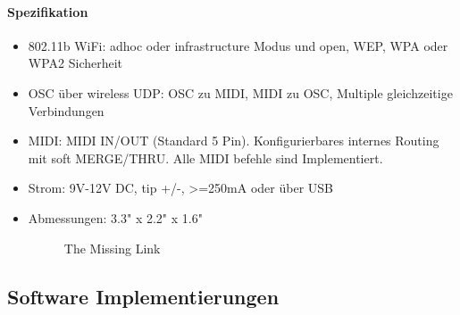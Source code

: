 \documentclass[a4paper, 12pt]{article}
\begin{document}
\paragraph{Spezifikation}
\begin{itemize}
  \item 802.11b WiFi: adhoc oder infrastructure Modus und open, WEP, WPA oder WPA2 Sicherheit
  \item OSC über wireless UDP: OSC zu MIDI, MIDI zu OSC, Multiple gleichzeitige Verbindungen
  \item MIDI: MIDI IN/OUT (Standard 5 Pin). Konfigurierbares internes Routing mit soft MERGE/THRU. Alle MIDI befehle sind Implementiert.
  \item Strom: 9V-12V DC, tip +/-, >=250mA oder über USB
  \item Abmessungen: 3.3" x 2.2" x 1.6"
\begin{figure}[!htb]
  \centering
  \caption[The Missing link \cite{TMLI}]{The Missing Link}
  \label{fig:TMLI}
\end{figure}
\end{itemize}
\subsection{Software Implementierungen}
\end{document}
